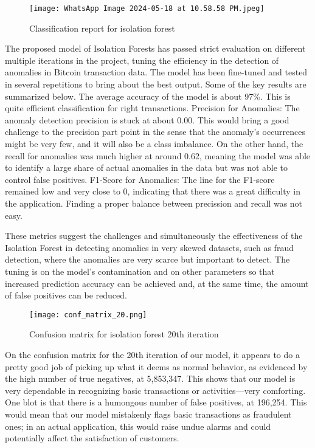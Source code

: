 \documentclass[journal]{IEEEtran}
\begin{document}
\begin{figure}
    \centering
    \texttt{[image: WhatsApp Image 2024-05-18 at 10.58.58 PM.jpeg]}
    \caption{Classification report for isolation forest}
    \label{fig:enter-label}
\end{figure}
The proposed model of Isolation Forests has passed strict evaluation on different multiple iterations in the project, tuning the efficiency in the detection of anomalies in Bitcoin transaction data. The model has been fine-tuned and tested in several repetitions to bring about the best output. Some of the key results are summarized below. The average accuracy of the model is about 97\%. This is quite efficient classification for right transactions. Precision for Anomalies: The anomaly detection precision is stuck at about 0.00. This would bring a good challenge to the precision part point in the sense that the anomaly's occurrences might be very few, and it will also be a class imbalance. On the other hand, the recall for anomalies was much higher at around 0.62, meaning the model was able to identify a large share of actual anomalies in the data but was not able to control false positives. F1-Score for Anomalies: The line for the F1-score remained low and very close to 0, indicating that there was a great difficulty in the application. Finding a proper balance between precission and recall was not easy.

These metrics suggest the challenges and simultaneously the effectiveness of the Isolation Forest in detecting anomalies in very skewed datasets, such as fraud detection, where the anomalies are very scarce but important to detect. The tuning is on the model's contamination and on other parameters so that increased prediction accuracy can be achieved and, at the same time, the amount of false positives can be reduced.


\begin{figure}
    \centering
    \texttt{[image: conf\_matrix\_20.png]}
    \caption{Confusion matrix for isolation forest 20th iteration}
    \label{fig:enter-label}
\end{figure}

On the confusion matrix for the 20th iteration of our model, it appears to do a pretty good job of picking up what it deems as normal behavior, as evidenced by the high number of true negatives, at 5,853,347. This shows that our model is very dependable in recognizing basic transactions or activities—very comforting. One blot is that there is a humongous number of false positives, at 196,254. This would mean that our model mistakenly flags basic transactions as fraudulent ones; in an actual application, this would raise undue alarms and could potentially affect the satisfaction of customers.
\end{document}
